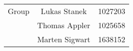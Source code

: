\documentclass{article}
\begin{document}
%
\author{ML Exercise 2 - Group 19}
%
%

\maketitle
\begin{center}
\begin{tabular}{l| c r}
Group & Lukas Stanek & 1027203 \\ %
& Thomas Appler & 1025658 \\
& Marten Sigwart & 1638152 \\
\end{tabular}
\end{center}
\end{document}
